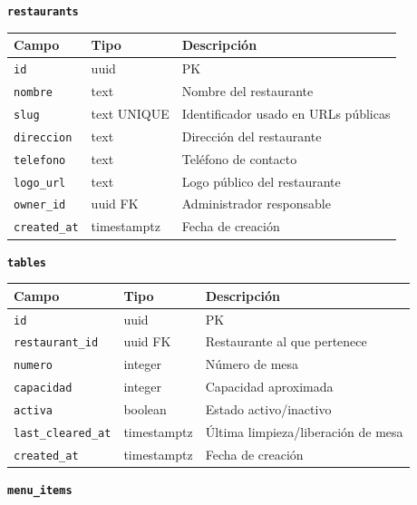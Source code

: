 \vspace{8pt}
\noindent\textbf{\texttt{restaurants}}

\begin{tabular}{lll}
  \toprule
  \textbf{Campo} & \textbf{Tipo} & \textbf{Descripción} \\
  \midrule
  \texttt{id} & uuid & PK \\
  \texttt{nombre} & text & Nombre del restaurante \\
  \texttt{slug} & text UNIQUE & Identificador usado en URLs públicas \\
  \texttt{direccion} & text & Dirección del restaurante \\
  \texttt{telefono} & text & Teléfono de contacto \\
  \texttt{logo\_url} & text & Logo público del restaurante \\
  \texttt{owner\_id} & uuid FK & Administrador responsable \\
  \texttt{created\_at} & timestamptz & Fecha de creación \\
  \bottomrule
\end{tabular}

\vspace{8pt}
\noindent\textbf{\texttt{tables}}

\begin{tabular}{lll}
  \toprule
  \textbf{Campo} & \textbf{Tipo} & \textbf{Descripción} \\
  \midrule
  \texttt{id} & uuid & PK \\
  \texttt{restaurant\_id} & uuid FK & Restaurante al que pertenece \\
  \texttt{numero} & integer & Número de mesa \\
  \texttt{capacidad} & integer & Capacidad aproximada \\
  \texttt{activa} & boolean & Estado activo/inactivo \\
  \texttt{last\_cleared\_at} & timestamptz & Última limpieza/liberación de mesa \\
  \texttt{created\_at} & timestamptz & Fecha de creación \\
  \bottomrule
\end{tabular}

\vspace{8pt}
\noindent\textbf{\texttt{menu\_items}}

